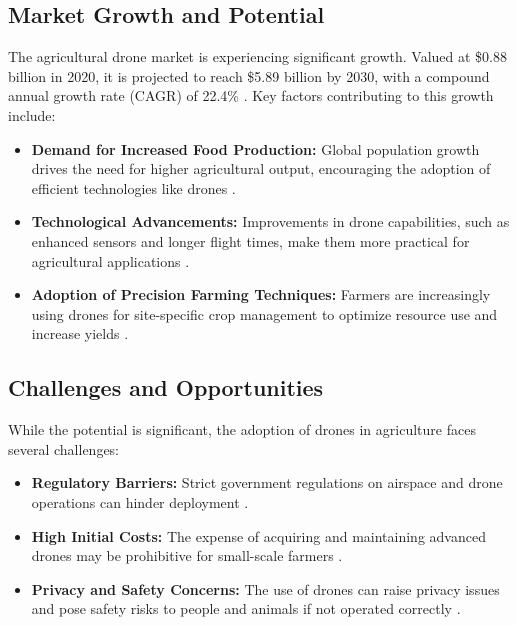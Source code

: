 \subsection{Market Growth and Potential}

The agricultural drone market is experiencing significant growth. Valued at \$0.88 billion in 2020, it is projected to reach \$5.89 billion by 2030, with a compound annual growth rate (CAGR) of 22.4\% \citep{alliedmarketresearch2021}. Key factors contributing to this growth include:

\begin{itemize} 
	\item \textbf{Demand for Increased Food Production:} Global population growth drives the need for higher agricultural output, encouraging the adoption of efficient technologies like drones \citep{nazarov2023}. 
	\item \textbf{Technological Advancements:} Improvements in drone capabilities, such as enhanced sensors and longer flight times, make them more practical for agricultural applications \citep{guardianagriculture}. 
	\item \textbf{Adoption of Precision Farming Techniques:} Farmers are increasingly using drones for site-specific crop management to optimize resource use and increase yields \citep{alliedmarketresearch2021}. 
\end{itemize}

\subsection{Challenges and Opportunities}

While the potential is significant, the adoption of drones in agriculture faces several challenges:

\begin{itemize} 
	\item \textbf{Regulatory Barriers:} Strict government regulations on airspace and drone operations can hinder deployment \citep{nazarov2023}. 
	\item \textbf{High Initial Costs:} The expense of acquiring and maintaining advanced drones may be prohibitive for small-scale farmers \citep{alliedmarketresearch2021}. 
	\item \textbf{Privacy and Safety Concerns:} The use of drones can raise privacy issues and pose safety risks to people and animals if not operated correctly \citep{petiole_drones_risks}. 
\end{itemize}

